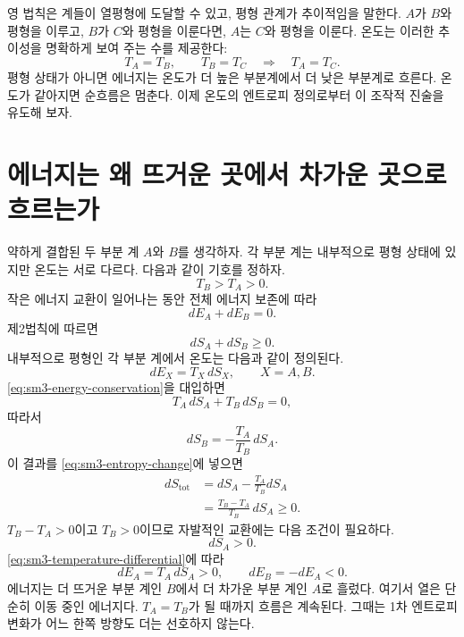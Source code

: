 영 법칙은 계들이 열평형에 도달할 수 있고, 평형 관계가 추이적임을 말한다. \(A\)가 \(B\)와 평형을 이루고, \(B\)가 \(C\)와 평형을 이룬다면, \(A\)는 \(C\)와 평형을 이룬다. 온도는 이러한 추이성을 명확하게 보여 주는 수를 제공한다:
\[
 T_A=T_B,\qquad T_B=T_C
 \quad\Longrightarrow\quad
 T_A=T_C.
\]
평형 상태가 아니면 에너지는 온도가 더 높은 부분계에서 더 낮은 부분계로 흐른다. 온도가 같아지면 순흐름은 멈춘다. 이제 온도의 엔트로피 정의로부터 이 조작적 진술을 유도해 보자.

\section{에너지는 왜 뜨거운 곳에서 차가운 곳으로 흐르는가}

약하게 결합된 두 부분 계 \(A\)와 \(B\)를 생각하자. 각 부분 계는 내부적으로 평형 상태에 있지만 온도는 서로 다르다. 다음과 같이 기호를 정하자.
\begin{equation}
 T_B>T_A>0.
 \label{eq:sm3-temperature-order}
\end{equation}작은 에너지 교환이 일어나는 동안 전체 에너지 보존에 따라
\begin{equation}
 dE_A+dE_B=0.
 \label{eq:sm3-energy-conservation}
\end{equation}제2법칙에 따르면
\begin{equation}
 dS_A+dS_B\geq0.
 \label{eq:sm3-entropy-change}
\end{equation}내부적으로 평형인 각 부분 계에서 온도는 다음과 같이 정의된다.
\begin{equation}
 dE_X=T_X\,dS_X,
 \qquad X=A,B.
 \label{eq:sm3-temperature-differential}
\end{equation}\eqref{eq:sm3-energy-conservation}을 대입하면
\begin{equation}
 T_A\,dS_A+T_B\,dS_B=0,
\end{equation}따라서
\begin{equation}
 dS_B=-\frac{T_A}{T_B}\,dS_A.
 \label{eq:sm3-dsb}
\end{equation}이 결과를 \eqref{eq:sm3-entropy-change}에 넣으면
\begin{align}
 dS_{\mathrm{tot}}
 &=dS_A-\frac{T_A}{T_B}dS_A\\
 &=\frac{T_B-T_A}{T_B}\,dS_A\geq0.
 \label{eq:sm3-flow-entropy}
\end{align}\(T_B-T_A>0\)이고 \(T_B>0\)이므로 자발적인 교환에는 다음 조건이 필요하다.
\[
 dS_A>0.
\]\eqref{eq:sm3-temperature-differential}에 따라
\begin{equation}
 dE_A=T_A\,dS_A>0,
 \qquad
 dE_B=-dE_A<0.
 \label{eq:sm3-hot-to-cold}
\end{equation}에너지는 더 뜨거운 부분 계인 \(B\)에서 더 차가운 부분 계인 \(A\)로 흘렀다. 여기서 열은 단순히 이동 중인 에너지다. \(T_A=T_B\)가 될 때까지 흐름은 계속된다. 그때는 1차 엔트로피 변화가 어느 한쪽 방향도 더는 선호하지 않는다.

